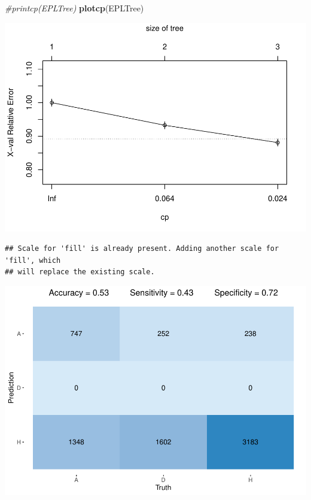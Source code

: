\documentclass[
]{article}
\newenvironment{Shaded}{\begin{snugshade}}{\end{snugshade}}
\newcommand{\CommentTok}[1]{\textcolor[rgb]{0.56,0.35,0.01}{\textit{#1}}}
\newcommand{\DataTypeTok}[1]{\textcolor[rgb]{0.13,0.29,0.53}{#1}}
\newcommand{\KeywordTok}[1]{\textcolor[rgb]{0.13,0.29,0.53}{\textbf{#1}}}
\newcommand{\NormalTok}[1]{#1}
\newcommand{\OperatorTok}[1]{\textcolor[rgb]{0.81,0.36,0.00}{\textbf{#1}}}
\newcommand{\StringTok}[1]{\textcolor[rgb]{0.31,0.60,0.02}{#1}}
\begin{document}
\begin{Shaded}
\begin{Highlighting}[]
\CommentTok{#printcp(EPLTree)}
\KeywordTok{plotcp}\NormalTok{(EPLTree)}
\end{Highlighting}
\end{Shaded}

\begin{center}\includegraphics{EPL_Model_files/figure-latex/unnamed-chunk-8-2} \end{center}

\begin{Shaded}
\end{Shaded}

\begin{verbatim}
## Scale for 'fill' is already present. Adding another scale for 'fill', which
## will replace the existing scale.
\end{verbatim}

\begin{center}\includegraphics{EPL_Model_files/figure-latex/unnamed-chunk-8-3} \end{center}
\end{document}
